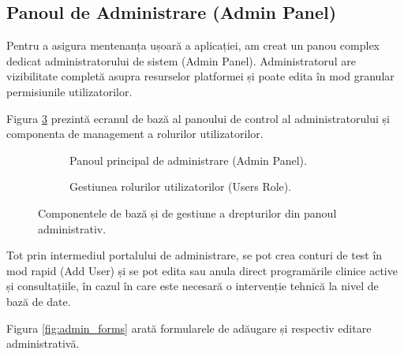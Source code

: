 \subsection{Panoul de Administrare (Admin Panel)}
Pentru a asigura mentenanța ușoară a aplicației, am creat un panou complex dedicat administratorului de sistem (Admin Panel). Administratorul are vizibilitate completă asupra resurselor platformei și poate edita în mod granular permisiunile utilizatorilor.

Figura \ref{fig:admin_dashboard_and_roles} prezintă ecranul de bază al panoului de control al administratorului și componenta de management a rolurilor utilizatorilor.

\begin{figure}[H]
    \centering
    \begin{subfigure}[b]{0.49\textwidth}
        \centering
        \color{red}
        \caption{Panoul principal de administrare (Admin Panel).}
        \label{fig:screenshot_admin_dashboard}
    \end{subfigure}
    \hfill
    \begin{subfigure}[b]{0.49\textwidth}
        \centering
        \color{red}
        \caption{Gestiunea rolurilor utilizatorilor (Users Role).}
        \label{fig:screenshot_admin_roles}
    \end{subfigure}
    \caption{Componentele de bază și de gestiune a drepturilor din panoul administrativ.}
    \label{fig:admin_dashboard_and_roles}
\end{figure}

Tot prin intermediul portalului de administrare, se pot crea conturi de test în mod rapid (Add User) și se pot edita sau anula direct programările clinice active și consultațiile, în cazul în care este necesară o intervenție tehnică la nivel de bază de date.

Figura \ref{fig:admin_forms} arată formularele de adăugare și respectiv editare administrativă.

